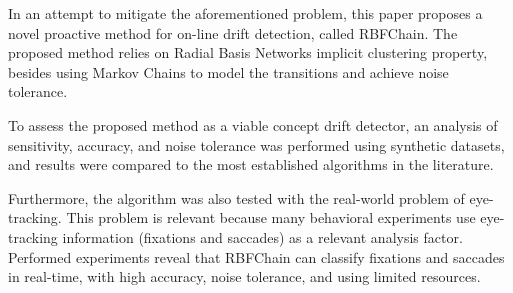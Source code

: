 \documentclass[preprint,12pt]{elsarticle}
\begin{document}
In an attempt to mitigate the aforementioned problem,
this paper proposes a novel proactive method for on-line drift detection,
called RBFChain.
The proposed method relies on Radial Basis Networks implicit clustering property,
besides using Markov Chains to model the transitions and achieve noise tolerance.

To assess the proposed method as a viable concept drift detector,
an analysis of sensitivity, accuracy,
and noise tolerance was performed using synthetic datasets,
and results were compared to the most established algorithms in the literature.

Furthermore, the algorithm was also tested with the real-world problem of eye-tracking.
This problem is relevant because many behavioral experiments use eye-tracking information (fixations and saccades) as a relevant analysis factor.
Performed experiments reveal that RBFChain can classify fixations and saccades in real-time, with high accuracy, noise tolerance, and using limited resources.



\end{document}
